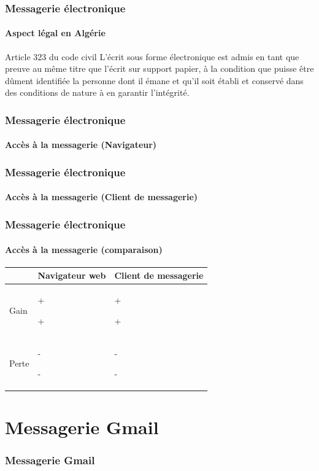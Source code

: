 \documentclass{beamer}
\begin{document}
\begin{frame}
\frametitle{Messagerie électronique}
\framesubtitle{Aspect légal en Algérie}


\begin{block}{Article 323 du code civil}
	L'écrit sous forme électronique est admis en tant que preuve au même titre que l'écrit sur support papier, à la condition que puisse être dûment identifiée la personne dont il émane et qu’il soit établi et conservé dans des conditions de nature à en garantir l'intégrité.
\end{block}

\end{frame}

\begin{frame}
\frametitle{Messagerie électronique}
\framesubtitle{Accès à la messagerie (Navigateur)}

\end{frame}

\begin{frame}
\frametitle{Messagerie électronique}
\framesubtitle{Accès à la messagerie (Client de messagerie)}

\end{frame}

\begin{frame}
\frametitle{Messagerie électronique}
\framesubtitle{Accès à la messagerie (comparaison)}

\begin{tabular}{p{}p{}p{}}
	\hline\hline
	& Navigateur web & Client de messagerie \\
	\hline\hline
	
	Gain &
	+  
	
	+ 
	
	& 
	+ 
	
	+ 
	\\
	
	\hline
	Perte &
	- 
	
	- 
	&
	- 
	
	- 
	\\
	\hline\hline
\end{tabular}

\end{frame}



\section{Messagerie Gmail}

\begin{frame}
\frametitle{Messagerie Gmail}

\end{frame}



%
% 
\end{document}
